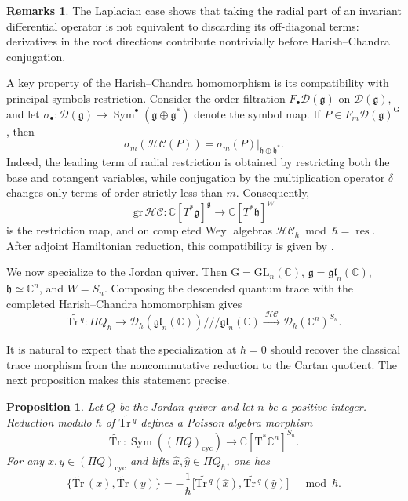 \documentclass[11pt,reqno]{amsart}
\newtheorem{proposition}[theorem]{Proposition}
\theoremstyle{definition}
\newtheorem{remarks}[theorem]{Remarks}
\newcommand{\bbC}{\mathbb{C}}
\newcommand{\gl}{\mathfrak{gl}}
\newcommand{\GL}{\mathrm{GL}}
\newcommand{\rmG}{\mathrm{G}}
\newcommand{\Tr}{\mathrm{Tr} \,}
\newcommand{\mD}{\mathcal{D}}
\newcommand{\fkg}{\mathfrak{g}}
\newcommand{\cyc}{\mathrm{cyc}}
\newcommand{\Sym}{\operatorname{Sym}}
\newcommand{\fkh}{\mathfrak{h}}
\newcommand{\hc}{\mathcal{HC}}
\newcommand{\gr}{\mathrm{gr}\,}
\newcommand{\rmT}{\mathrm{T}}
\newcommand{\tTr}{\widetilde{\Tr}}
\begin{document}
\begin{remarks}\label{rmk: comput laplace}
The Laplacian case shows that taking the radial part of an invariant differential operator is not equivalent to discarding its off-diagonal terms: derivatives in the root directions contribute nontrivially before Harish--Chandra conjugation.
\end{remarks}


A key property of the Harish--Chandra homomorphism is its compatibility with principal symbols restriction.
Consider the order filtration \(F_\bullet \mD(\fkg)\) on $\mD(\fkg)$, and let \(\sigma_\bullet: \mD(\fkg)\to\Sym^\bullet (\fkg\oplus\fkg^*)\) denote the symbol map.  If 
\(P\in F_m\mD(\fkg)^{\rmG}\), then
\[
\sigma_m(\hc(P))
=
\left.\sigma_m(P)\right|_{\fkh\oplus\fkh^*}.
\]
Indeed, the leading term of radial restriction is obtained by restricting
both the base and cotangent variables, while conjugation by the
multiplication operator \(\delta\) changes only terms of order strictly
less than \(m\).  Consequently,
\[
\gr\hc:
\bbC[T^*\fkg]^{\fkg}
\longrightarrow
\bbC[T^*\fkh]^W
\]
is the restriction map, and on completed Weyl algebras
\(\hc_\hbar\bmod\hbar=\operatorname{res}\).  After adjoint Hamiltonian
reduction, this compatibility is given by \cite[Theorem~6.10(ii)]{EG2002}.

We now specialize to the Jordan quiver.  Then
\(\rmG=\GL_n(\bbC)\), \(\fkg=\gl_n(\bbC)\),
\(\fkh\simeq\bbC^n\), and \(W=S_n\).
Composing the descended quantum trace with the completed
Harish--Chandra homomorphism gives
\[
\widetilde{\Tr^q}:
\Pi Q_{\hbar}
\longrightarrow
\mD_\hbar (\gl_n (\bbC))///\gl_n(\bbC)
\xrightarrow{\ \hc\ }
\mD_\hbar(\bbC^n)^{S_n}.
\]









It is natural to expect that the specialization at \(\hbar=0\) should recover the classical trace morphism from the noncommutative reduction to the Cartan quotient.  The next proposition makes this statement precise.

\begin{proposition}\label{prop: tilt Tr semiclassical}
{Let \(Q\) be the Jordan quiver and let \(n\) be a positive integer.  Reduction modulo \(\hbar\) of \(\widetilde{\Tr^q}\) defines a Poisson algebra morphism
\[
\tTr:
\Sym((\Pi Q)_\cyc)
\longrightarrow
\bbC[\rmT^\ast\bbC^n]^{S_n}.
\]
For any \(x,y\in(\Pi Q)_\cyc\) and lifts \(\widehat{x},\widehat{y}\in\Pi Q_{\hbar}\), one has
\[
\{\tTr(x),\tTr(y)\}
=
-\frac{1}{\hbar}
\bigl[
\widetilde{\Tr^q}(\widehat{x}),
\widetilde{\Tr^q}(\widehat{y})
\bigr]
\quad\bmod\hbar.
\]}
\end{proposition}
\end{document}
